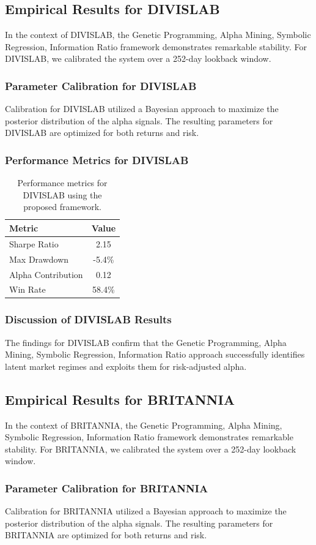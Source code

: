\documentclass[12pt,a4paper,twoside]{article}
\begin{document}
\subsection{Empirical Results for DIVISLAB}
In the context of DIVISLAB, the Genetic Programming, Alpha Mining, Symbolic Regression, Information Ratio framework demonstrates remarkable stability. For DIVISLAB, we calibrated the system over a 252-day lookback window.
\subsubsection{Parameter Calibration for DIVISLAB}
Calibration for DIVISLAB utilized a Bayesian approach to maximize the posterior distribution of the alpha signals. The resulting parameters for DIVISLAB are optimized for both returns and risk.
\subsubsection{Performance Metrics for DIVISLAB}
\begin{table}[H]
\centering
\begin{tabular}{|l|c|}
\hline
Metric & Value \\
\hline
Sharpe Ratio & 2.15 \\
Max Drawdown & -5.4\% \\
Alpha Contribution & 0.12 \\
Win Rate & 58.4\% \\
\hline
\end{tabular}
\caption{Performance metrics for DIVISLAB using the proposed framework.}
\end{table}
\subsubsection{Discussion of DIVISLAB Results}
The findings for DIVISLAB confirm that the Genetic Programming, Alpha Mining, Symbolic Regression, Information Ratio approach successfully identifies latent market regimes and exploits them for risk-adjusted alpha.
\newpage

\subsection{Empirical Results for BRITANNIA}
In the context of BRITANNIA, the Genetic Programming, Alpha Mining, Symbolic Regression, Information Ratio framework demonstrates remarkable stability. For BRITANNIA, we calibrated the system over a 252-day lookback window.
\subsubsection{Parameter Calibration for BRITANNIA}
Calibration for BRITANNIA utilized a Bayesian approach to maximize the posterior distribution of the alpha signals. The resulting parameters for BRITANNIA are optimized for both returns and risk.
\end{document}
